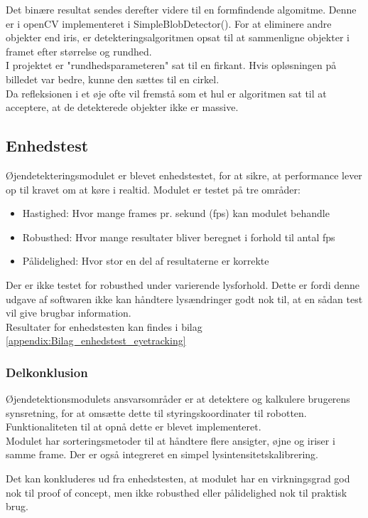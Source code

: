 Det binære resultat sendes derefter videre til en formfindende algomitme.
Denne er i openCV implementeret i SimpleBlobDetector(). 
For at eliminere andre objekter end iris, er detekteringsalgoritmen opsat til at sammenligne objekter i framet efter størrelse og rundhed. \\
I projektet er "rundhedsparameteren" sat til en firkant. 
Hvis opløsningen på billedet var bedre, kunne den sættes til en cirkel. \\
Da refleksionen i et øje ofte vil fremstå som et hul er algoritmen sat til at acceptere, at de detekterede objekter ikke er massive.


\subsection{Enhedstest}
Øjendetekteringsmodulet er blevet enhedstestet, for at sikre, at performance lever op til kravet om at køre i realtid. 
Modulet er testet på tre områder:

\begin{itemize}
	\item Hastighed: Hvor mange frames pr. sekund (fps) kan modulet behandle
	\item Robusthed: Hvor mange resultater bliver beregnet i forhold til antal fps
	\item Pålidelighed: Hvor stor en del af resultaterne er korrekte
\end{itemize}

Der er ikke testet for robusthed under varierende lysforhold.
Dette er fordi denne udgave af softwaren ikke kan håndtere lysændringer godt nok til, at en sådan test vil give brugbar information. \\
Resultater for enhedstesten kan findes i bilag \ref{appendix:Bilag_enhedstest_eyetracking}

\subsubsection{Delkonklusion}
Øjendetektionsmodulets ansvarsområder er at detektere og kalkulere brugerens synsretning, for at omsætte dette til styringskoordinater til robotten. 
Funktionaliteten til at opnå dette er blevet implementeret.\\ 
Modulet har sorteringsmetoder til at håndtere flere ansigter, øjne og iriser i samme frame. 
Der er også integreret en simpel lysintensitetskalibrering.

Det kan konkluderes ud fra enhedstesten, at modulet har en virkningsgrad god nok til proof of concept, men ikke robusthed eller pålidelighed nok til praktisk brug.  

%